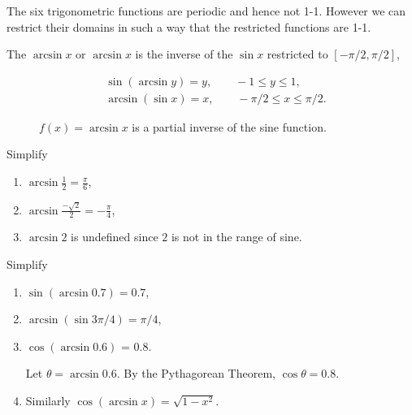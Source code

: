 \documentclass[../calc1-main.tex]{subfiles}
\begin{document}
The six trigonometric functions are periodic and hence not 1-1. However we can restrict their domains in such a way that the restricted functions are 1-1.

\begin{minipage}{0.5\textwidth}
  The $\arcsin x$ or $\arcsin x$ is the inverse of the $\sin x$ restricted to $[-\pi/2, \pi/2]$,

  \begin{align*}
    & \sin (\arcsin y) = y, \qquad -1 \le y \le 1, \\
    & \arcsin (\sin x) = x, \qquad -\pi/2 \le x \le \pi/2.
  \end{align*}
\end{minipage}%
\begin{minipage}{0.5\textwidth}
  \begin{figure}[H]
    \centering
    
    \caption{$f(x) = \arcsin x$ is a partial inverse of the sine function.}
  \end{figure}
\end{minipage}

\begin{example}
  Simplify
  \begin{enumerate}
    \item $\arcsin \frac{1}{2} = \frac{\pi}{6}$,

    \item $\arcsin \frac{-\sqrt{2}}{2} = -\frac{\pi}{4}$,

    \item $\arcsin 2$ is undefined since $2$ is not in the range of sine.
  \end{enumerate}
\end{example}

\begin{example}
  Simplify
  \begin{enumerate}
    \item $\sin(\arcsin 0.7) = 0.7$,

    \item $\arcsin (\sin 3 \pi/4) = \pi/4$,

    \item $\cos (\arcsin 0.6)$ = 0.8.

    \begin{solution}
      Let $\theta=\arcsin 0.6$. By the Pythagorean Theorem, $\cos \theta = 0.8$.
    \end{solution}
    \item Similarly $\cos (\arcsin x) = \sqrt{1-x^2}$.

  \end{enumerate}
\end{example}
\end{document}
